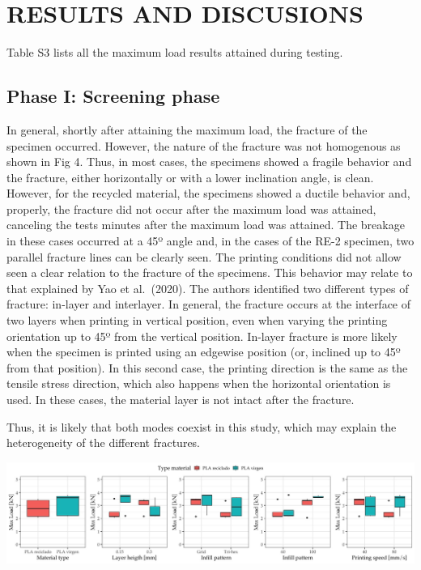 \documentclass[]{elsarticle} %
\begin{document}
\hypertarget{results-and-discusions}{%
\section{RESULTS AND DISCUSIONS}\label{results-and-discusions}}

Table S3 lists all the maximum load results attained during testing.

\hypertarget{phase-i-screening-phase}{%
\subsection{Phase I: Screening phase}\label{phase-i-screening-phase}}

In general, shortly after attaining the maximum load, the fracture of
the specimen occurred. However, the nature of the fracture was not
homogenous as shown in Fig 4. Thus, in most cases, the specimens showed
a fragile behavior and the fracture, either horizontally or with a lower
inclination angle, is clean. However, for the recycled material, the
specimens showed a ductile behavior and, properly, the fracture did not
occur after the maximum load was attained, canceling the tests minutes
after the maximum load was attained. The breakage in these cases
occurred at a 45º angle and, in the cases of the RE-2 specimen, two
parallel fracture lines can be clearly seen. The printing conditions did
not allow seen a clear relation to the fracture of the specimens. This
behavior may relate to that explained by Yao et al.~(2020). The authors
identified two different types of fracture: in-layer and interlayer. In
general, the fracture occurs at the interface of two layers when
printing in vertical position, even when varying the printing
orientation up to 45º from the vertical position. In-layer fracture is
more likely when the specimen is printed using an edgewise position (or,
inclined up to 45º from that position). In this second case, the
printing direction is the same as the tensile stress direction, which
also happens when the horizontal orientation is used. In these cases,
the material layer is not intact after the fracture.

Thus, it is likely that both modes coexist in this study, which may
explain the heterogeneity of the different fractures.

\includegraphics[width=21.86in]{Figures/Phase.1}
\end{document}
